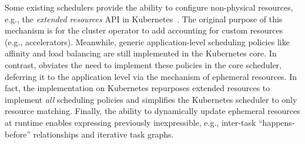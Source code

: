 Some existing schedulers provide the ability to configure non-physical resources, e.g., the \emph{extended resources} API in Kubernetes~\cite{kubernetesextres}.
The original purpose of this mechanism is for the cluster operator to add accounting for custom resources  (e.g., accelerators).
Meanwhile, generic application-level scheduling policies like affinity and load balancing are still implemented in the Kubernetes core. In contrast, \name{} obviates the need to implement these policies in the core scheduler, deferring it to the application level via the mechanism of ephemeral resources.
In fact, the \name{} implementation on Kubernetes repurposes extended resources to implement \emph{all} scheduling policies and simplifies the Kubernetes scheduler to only resource matching.
Finally, the ability to dynamically update ephemeral resources at runtime enables expressing previously inexpressible, e.g., inter-task ``happens-before'' relationships and iterative task graphs.



